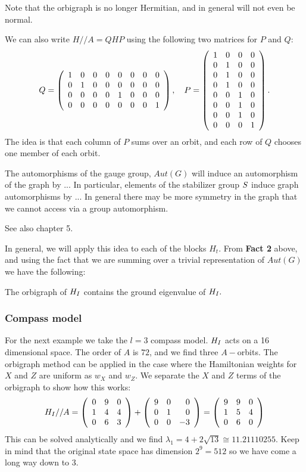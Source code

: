 \documentclass[12pt]{article}
\renewenvironment{framed}[1][\hsize]{%
\def\FrameCommand{{\color{black}\vrule width 3pt}\hspace{0pt}\fboxsep=\FrameSep\colorbox{lightgray}}%
\MakeFramed{\hsize0.8\linewidth\advance\hsize-\width\FrameRestore}}
{\endMakeFramed}
\begin{document}
Note that the orbigraph is no longer Hermitian,
and in general will not even be normal.

We can also write $H//A = QHP$ using the following two matrices for $P$ and $Q:$
$$
Q = 
\left(\begin{array}{rrrrrrrr}
 1 &  0 &  0 &  0 &  0 &  0 &  0 &  0 \cr
  0 &  1 &  0 &  0 &  0 &  0 &  0 &  0 \cr
  0 &  0 &  0 &  0 &  1 &  0 &  0 &  0 \cr
  0 &  0 &  0 &  0 &  0 &  0 &  0 &  1
\end{array}\right),\ \ \ 
P = 
\left(\begin{array}{rrrr}
 1 &  0 &  0 &  0 \cr
  0 &  1 &  0 &  0 \cr
  0 &  1 &  0 &  0 \cr
  0 &  1 &  0 &  0 \cr
  0 &  0 &  1 &  0 \cr
  0 &  0 &  1 &  0 \cr
  0 &  0 &  1 &  0 \cr
  0 &  0 &  0 &  1
\end{array}\right).
$$
The idea is that each column of $P$ sums over an orbit,
and each row of $Q$ chooses one member of each orbit.

The automorphisms of the gauge group, $Aut(G)$ will induce an
automorphism of the graph by ...
In particular, elements of the stabilizer group $S$ induce graph 
automorphisms by ...
In general there may be more symmetry in the graph that
we cannot access via a group automorphism.

See also \cite{Cvetkovic1980} chapter 5.

In general, we will apply this idea to each of the blocks $H_t$.
From {\bf Fact 2} above, and using the fact that we are
summing over a trivial representation of $Aut(G)$ we have the following:
\begin{framed}

The orbigraph of $H_I$ contains the ground eigenvalue of $H_I.$
\end{framed}

%
\subsubsection{Compass model}
For the next example we take the $l=3$ compass model.
$H_I$ acts on a 16 dimensional space.
The order of $A$ is $72$, and we find three $A-$orbits.
The orbigraph method can be applied in the case
where the Hamiltonian weights for $X$ and $Z$ are uniform as $w_X$ and $w_Z.$
We separate the $X$ and $Z$ terms of the orbigraph to show
how this works:
$$
H_I//A = 
\left(\begin{array}{rrr}
 0 &  9 &  0 \cr
  1 &  4 &  4 \cr
  0 &  6 &  3
\end{array}\right) + 
\left(\begin{array}{rrr}
 9 &  0 &  0 \cr
  0 &  1 &  0 \cr
  0 &  0 &  -3
\end{array}\right)
=
\left(\begin{array}{rrr}
 9 &  9 &  0 \cr
  1 &  5 &  4 \cr
  0 &  6 &  0
\end{array}\right)
$$
This can be solved analytically and we find $\lambda_1 = 4+2\sqrt{13} \cong 11.21110255.$
Keep in mind that the original state space has dimension $2^9=512$ so we
have come a long way down to 3.
\end{document}
